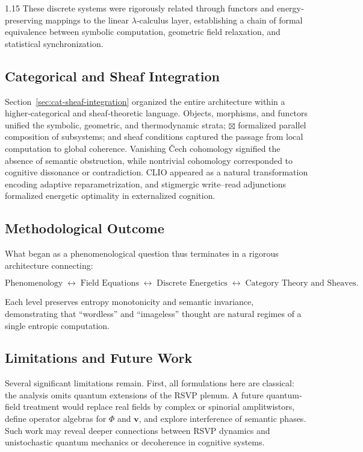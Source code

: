 \documentclass[12pt,a4paper]{article}
\begin{document}
\begin{spacing}{1.15}
These discrete systems were rigorously related through functors and
energy‐preserving mappings to the linear $\lambda$‐calculus layer,
establishing a chain of formal equivalence between
symbolic computation, geometric field relaxation, and
statistical synchronization.

\subsection{Categorical and Sheaf Integration}

Section~\ref{sec:cat-sheaf-integration} organized the entire architecture
within a higher‐categorical and sheaf‐theoretic language.
Objects, morphisms, and functors unified the symbolic, geometric,
and thermodynamic strata; $\boxtimes$ formalized parallel composition of
subsystems; and sheaf conditions captured the passage from local
computation to global coherence.
Vanishing Čech cohomology signified the absence of semantic obstruction,
while nontrivial cohomology corresponded to cognitive dissonance or
contradiction.
CLIO appeared as a natural transformation encoding adaptive reparametrization,
and stigmergic write–read adjunctions formalized energetic optimality
in externalized cognition.

\subsection{Methodological Outcome}

What began as a phenomenological question thus terminates in a
rigorous architecture connecting:

\[
\text{Phenomenology} \;\longleftrightarrow\;
\text{Field Equations} \;\longleftrightarrow\;
\text{Discrete Energetics} \;\longleftrightarrow\;
\text{Category Theory and Sheaves}.
\]

Each level preserves entropy monotonicity and semantic invariance,
demonstrating that ``wordless'' and ``imageless'' thought are natural
regimes of a single entropic computation.

\subsection{Limitations and Future Work}

Several significant limitations remain.
First, all formulations here are classical:
the analysis omits quantum extensions of the RSVP plenum.
A future quantum‐field treatment would replace real fields by
complex or spinorial amplitwistors,
define operator algebras for $\Phi$ and $\mathbf{v}$,
and explore interference of semantic phases.
Such work may reveal deeper connections between RSVP dynamics
and unistochastic quantum mechanics or decoherence in cognitive systems.


\end{spacing}
\end{document}
